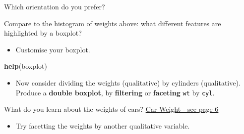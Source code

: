 \documentclass[]{article}
\newenvironment{Shaded}{\begin{snugshade}}{\end{snugshade}}
\newcommand{\DataTypeTok}[1]{\textcolor[rgb]{0.13,0.29,0.53}{#1}}
\newcommand{\KeywordTok}[1]{\textcolor[rgb]{0.13,0.29,0.53}{\textbf{#1}}}
\newcommand{\NormalTok}[1]{#1}
\newcommand{\OperatorTok}[1]{\textcolor[rgb]{0.81,0.36,0.00}{\textbf{#1}}}
\newcommand{\StringTok}[1]{\textcolor[rgb]{0.31,0.60,0.02}{#1}}
\providecommand{\tightlist}{%
  \setlength{\itemsep}{0pt}\setlength{\parskip}{0pt}}
\begin{document}
\begin{Shaded}
\end{Shaded}

Which orientation do you prefer?

Compare to the histogram of weights above: what different features are highlighted by a boxplot?

\begin{itemize}
\tightlist
\item
  Customise your boxplot.
\end{itemize}

\begin{Shaded}
\begin{Highlighting}[]
\KeywordTok{help}\NormalTok{(boxplot)}
\end{Highlighting}
\end{Shaded}

\begin{itemize}
\tightlist
\item
  Now consider dividing the weights (qualitative) by cylinders (qualitative). Produce a \textbf{double boxplot}, by \textbf{filtering} or \textbf{faceting} \texttt{wt} by \texttt{cyl}.
\end{itemize}

\begin{Shaded}
\end{Shaded}

What do you learn about the weights of cars?
\href{http://web.mit.edu/sloan-auto-lab/research/beforeh2/files/MacKenzie\%20Zoepf\%20Heywood\%20Car\%20Weight\%20Trends\%20-\%20IJVD.pdf}{Car Weight - see page 6}

\begin{itemize}
\tightlist
\item
  Try facetting the weights by another qualitative variable.
\end{itemize}
\end{document}

